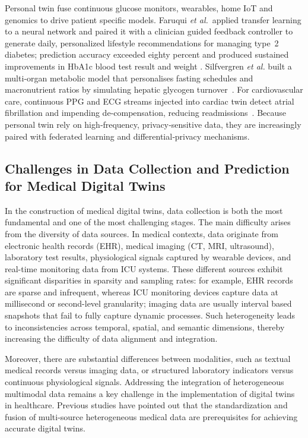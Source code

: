 \documentclass[acmsmall]{acmart}
\begin{document}
Personal twin fuse continuous glucose monitors, wearables, home IoT and genomics to drive patient specific models. Faruqui \emph{et al.}\ applied transfer learning to a neural network and paired it with a clinician guided feedback controller to generate daily, personalized lifestyle recommendations for managing type 2 diabetes; prediction accuracy exceeded eighty percent and produced sustained improvements in HbA1c blood test result and weight \cite{Faruqui2024}. Silfvergren \emph{et al.} built a multi‑organ metabolic model that personalises fasting schedules and macronutrient ratios by simulating hepatic glycogen turnover \cite{Silfvergren2022}. For cardiovascular care, continuous PPG and ECG streams injected into cardiac twin detect atrial fibrillation and impending de‑compensation, reducing readmissions \cite{Bayoumy2021,Williams2023}. Because personal twin rely on high‑frequency, privacy‑sensitive data, they are increasingly paired with federated learning and differential‑privacy mechanisms.


\subsection{Challenges in Data Collection and Prediction for Medical Digital Twins}

In the construction of medical digital twins, data collection is both the most fundamental and one of the most challenging stages. The main difficulty arises from the diversity of data sources. In medical contexts, data originate from electronic health records (EHR), medical imaging (CT, MRI, ultrasound), laboratory test results, physiological signals captured by wearable devices, and real-time monitoring data from ICU systems. These different sources exhibit significant disparities in sparsity and sampling rates: for example, EHR records are sparse and infrequent, whereas ICU monitoring devices capture data at millisecond or second-level granularity; imaging data are usually interval based snapshots that fail to fully capture dynamic processes. Such heterogeneity leads to inconsistencies across temporal, spatial, and semantic dimensions, thereby increasing the difficulty of data alignment and integration.

Moreover, there are substantial differences between modalities, such as textual medical records versus imaging data, or structured laboratory indicators versus continuous physiological signals. Addressing the integration of heterogeneous multimodal data remains a key challenge in the implementation of digital twins in healthcare. Previous studies have pointed out that the standardization and fusion of multi-source heterogeneous medical data are prerequisites for achieving accurate digital twins\cite{tao2019digital,reddy2015healthcare}.
\end{document}
